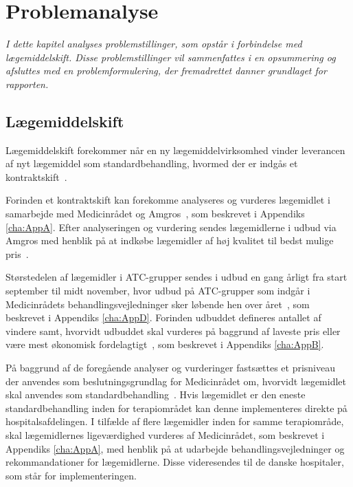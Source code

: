 \chapter{Problemanalyse}
\textit{I dette kapitel analyses problemstillinger, som opstår i forbindelse med lægemiddelskift. Disse problemstillinger vil sammenfattes i en opsummering og afsluttes med en problemformulering, der fremadrettet danner  grundlaget for rapporten.}

\section{Lægemiddelskift}
Lægemiddelskift forekommer når en ny lægemiddelvirksomhed vinder leverancen af nyt lægemiddel som standardbehandling, hvormed der er indgås et kontraktskift~\citep{Amgros2015}. 

Forinden et kontraktskift kan forekomme analyseres og vurderes lægemidlet i samarbejde med Medicinrådet og Amgros~\citep{DanskeRegioner2016}, som beskrevet i Appendiks \ref{cha:AppA}. Efter analyseringen og vurdering sendes lægemidlerne i udbud via Amgros med henblik på at indkøbe lægemidler af høj kvalitet til bedst mulige pris~\citep{Sygehusapoteket2017}.

Størstedelen af lægemidler i ATC-grupper sendes i udbud en gang årligt fra start september til midt november, hvor udbud på ATC-grupper som indgår i Medicinrådets behandlingsvejledninger sker løbende hen over året~\citep{Sygehusapoteket2017}, som beskrevet i Appendiks \ref{cha:AppD}.
Forinden udbuddet defineres antallet af vindere samt, hvorvidt udbuddet skal vurderes på baggrund af laveste pris eller være mest økonomisk fordelagtigt~\citep{Amgros2018a}, som beskrevet i Appendiks \ref{cha:AppB}.

På baggrund af de foregående analyser og vurderinger fastsættes et prisniveau der anvendes som beslutningsgrundlag for Medicinrådet om, hvorvidt lægemidlet skal anvendes som standardbehandling~\citep{DanskeRegioner2016}. Hvis lægemidlet er den eneste standardbehandling inden for terapiområdet kan denne implementeres direkte på hospitalsafdelingen. I tilfælde af flere lægemidler inden for samme terapiområde, skal lægemidlernes ligeværdighed vurderes af Medicinrådet, som beskrevet i Appendiks \ref{cha:AppA}, med henblik på at udarbejde behandlingsvejledninger og rekommandationer for lægemidlerne. Disse videresendes til de danske hospitaler, som står for implementeringen.~\citep{DanskeRegioner2016}

